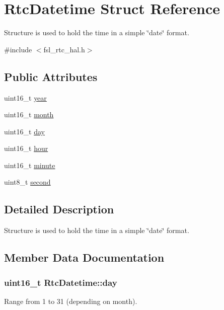 \hypertarget{structRtcDatetime}{}\section{Rtc\+Datetime Struct Reference}
\label{structRtcDatetime}


Structure is used to hold the time in a simple \char`\"{}date\char`\"{} format.  




{\ttfamily \#include $<$fsl\+\_\+rtc\+\_\+hal.\+h$>$}

\subsection*{Public Attributes}
\begin{DoxyCompactItemize}
\item 
uint16\+\_\+t \hyperlink{structRtcDatetime_aacb95816fa15796ff868593e554a05b1}{year}
\item 
uint16\+\_\+t \hyperlink{structRtcDatetime_acf10f2a594882e873a074092bfb6fb01}{month}
\item 
uint16\+\_\+t \hyperlink{structRtcDatetime_acf5f6a9c702e31482e5c1447d60becd9}{day}
\item 
uint16\+\_\+t \hyperlink{structRtcDatetime_accc5c6b219d1efc080c6a10200411314}{hour}
\item 
uint16\+\_\+t \hyperlink{structRtcDatetime_a5ca18c61b89c54e30d99c69720e76be4}{minute}
\item 
uint8\+\_\+t \hyperlink{structRtcDatetime_a4ce9fbd6cfb0dc6dfbe73453b7f557c7}{second}
\end{DoxyCompactItemize}


\subsection{Detailed Description}
Structure is used to hold the time in a simple \char`\"{}date\char`\"{} format. 

\subsection{Member Data Documentation}
\subsubsection[{\texorpdfstring{day}{day}}]{\setlength{\rightskip}{0pt plus 5cm}uint16\+\_\+t Rtc\+Datetime\+::day}\hypertarget{structRtcDatetime_acf5f6a9c702e31482e5c1447d60becd9}{}\label{structRtcDatetime_acf5f6a9c702e31482e5c1447d60becd9}
Range from 1 to 31 (depending on month). 
